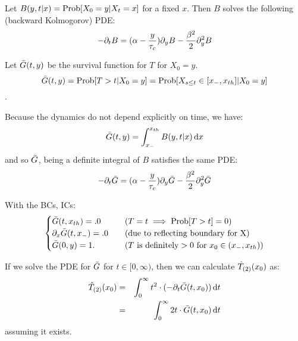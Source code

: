 \documentclass{article}
\begin{document}
Let $B(y,t|x) = \operatorname{Prob}[X_0 = y| X_t = x]$ for a fixed $x$. Then $B$ solves the
following (backward Kolmogorov) PDE:
\begin{equation}
-{\partial}_t B = ({\alpha} - \frac y{{ \tau_{c} }}){\partial}_yB - \frac {{\beta}^2} 2 {\partial}_y^2 B
\label{eq:backward_Xdensity}
\end{equation}

Let ${ \bar{G} }(t,y)$ be the survival function for $T$ for $X_0 = y$. 
$${ \bar{G} }(t,y) = \operatorname{Prob}[T>t | X_0 = y] = \operatorname{Prob}[X_{s\leq t} \in [{ x_{-} },
{ x_{th} }] | X_0 = y]$$.

Because the dynamics do not depend explicitly on time, we have:
$$
{ \bar{G} }(t,y) = \int_{ x_{-} }^{ x_{th} } B(y,t|x) \, \mathrm{d} x
$$
and so ${ \bar{G} }$, being a definite integral of $B$ satisfies the same PDE:
\begin{equation}
-{\partial}_t { \bar{G} } = ({\alpha} - \frac y{{ \tau_{c} }}) {\partial}_y{ \bar{G} } - \frac {{\beta}^2} 2 {\partial}_y^2 { \bar{G} }
\label{eq:backward_SDF}
\end{equation}

With the BCs, ICs:
\begin{equation}
\begin{cases}
{ \bar{G} }(t,{ x_{th} }) = .0 & \quad (T = t \implies \operatorname{Prob}[T>t] = 0)
\\
{\partial}_x { \bar{G} }(t,{ x_{-} }) = .0  & \quad (\textrm{due to reflecting boundary for X})
\\
{ \bar{G} }(0, y) = 1. & \quad (T \textrm{ is definitely} > 0 \textrm{ for } x_0 \in
({ x_{-} }, { x_{th} }) )
\end{cases}
\end{equation}

If we solve the PDE for ${ \bar{G} }$ for $t \in [0,\infty)$, then we can calculate
${ \hat{T}_{(2)} }(x_0)$ as:
\begin{eqnarray}
{ \hat{T}_{(2)} }(x_0) &=& \int_0^\infty t^2 \cdot (-{\partial}_t{ \bar{G} }(t,x_0)) \, \mathrm{d} t
\\
		   &=& \int_0^\infty 2t \cdot { \bar{G} }(t,x_0) \, \mathrm{d} t
\end{eqnarray}
assuming it exists.
\end{document}

